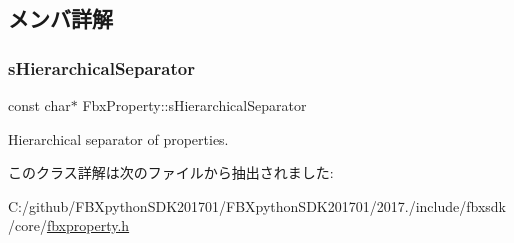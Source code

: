 \subsection{メンバ詳解}
\mbox{\label{class_fbx_property_a4b55a5fb0b5e63c3db166e64f38bec1d}} 
\subsubsection{\texorpdfstring{s\+Hierarchical\+Separator}{sHierarchicalSeparator}}
{\footnotesize\ttfamily const char$\ast$ Fbx\+Property\+::s\+Hierarchical\+Separator\hspace{0.3cm}{\ttfamily [static]}}



Hierarchical separator of properties. 



このクラス詳解は次のファイルから抽出されました\+:\begin{DoxyCompactItemize}
\item 
C\+:/github/\+F\+B\+Xpython\+S\+D\+K201701/\+F\+B\+Xpython\+S\+D\+K201701/2017./include/fbxsdk/core/\hyperlink{fbxproperty_8h}{fbxproperty.\+h}\end{DoxyCompactItemize}
